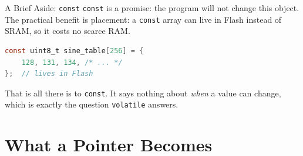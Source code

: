 \documentclass[9pt,aspectratio=169,xcolor=table]{beamer}
\begin{document}
\begin{frame}[fragile]{A Brief Aside: \texttt{const}}
    \leavevmode
    \texttt{const} is a promise: the program will not change this
    object. The practical benefit is \alert{placement}: a
    \texttt{const} array can live in Flash instead of SRAM, so it
    costs no scarce RAM.

    \vspace{3mm}
\begin{lstlisting}[language=C, basicstyle=\ttfamily\normalsize]
const uint8_t sine_table[256] = {
    128, 131, 134, /* ... */
};  // lives in Flash
\end{lstlisting}

    \vspace{3mm}
    {\small That is all there is to \texttt{const}. It says nothing
    about \emph{when} a value can change, which is exactly the question
    \texttt{volatile} answers.}
\end{frame}


\section{What a Pointer Becomes}
\end{document}
